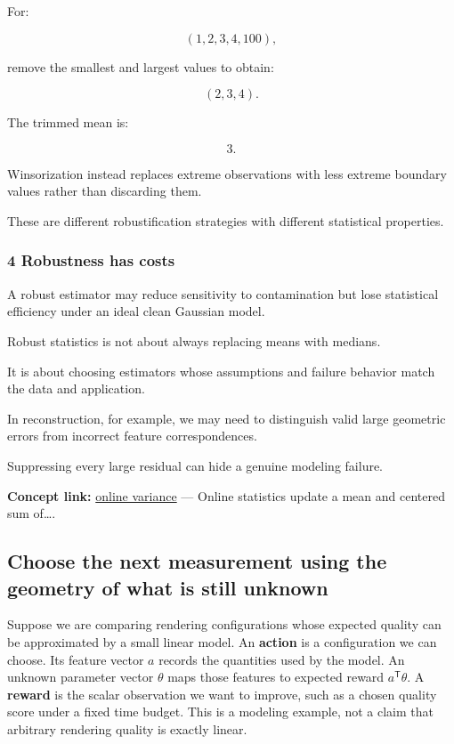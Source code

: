For:

\[
 (1,2,3,4,100),
\]

remove the smallest and largest values to obtain:

\[
 (2,3,4).
\]

The trimmed mean is:

\[
 \boxed{3}.
\]

Winsorization instead replaces extreme observations with less extreme boundary values rather than discarding them.

These are different robustification strategies with different statistical properties.

\subsubsection{4 Robustness has costs}\label{02-foundations-ii-ch030-robustness-has-costs}

A robust estimator may reduce sensitivity to contamination but lose statistical efficiency under an ideal clean Gaussian model.

Robust statistics is not about always replacing means with medians.

It is about choosing estimators whose assumptions and failure behavior match the data and application.

In reconstruction, for example, we may need to distinguish valid large geometric errors from incorrect feature correspondences.

Suppressing every large residual can hide a genuine modeling failure.

\textbf{Concept link:} \hyperref[02-foundations-ii-ch030-finite-samples-need-stable-descriptive-statistics]{online variance} --- Online statistics update a mean and centered sum of\ldots.

\subsection{Choose the next measurement using the geometry of what is still unknown}\label{02-foundations-ii-ch030-choose-the-next-measurement-using-the-geometry-of-what-is-still-unknown}

Suppose we are comparing rendering configurations whose expected quality can be approximated by a small linear model. An \textbf{action} is a configuration we can choose. Its feature vector \(a\) records the quantities used by the model. An unknown parameter vector \(\theta\) maps those features to expected reward \(a^{\mathsf T}\theta\). A \textbf{reward} is the scalar observation we want to improve, such as a chosen quality score under a fixed time budget. This is a modeling example, not a claim that arbitrary rendering quality is exactly linear.

